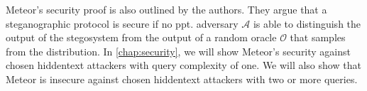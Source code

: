 Meteor's security proof is also outlined by the authors.
They argue that a steganographic protocol is secure if no ppt. adversary $\mathcal{A}$ is able to distinguish the output of the stegosystem from the output of a random oracle $\mathcal{O}$ that samples from the distribution.
In \autoref{chap:security}, we will show Meteor's security against chosen hiddentext attackers with query complexity of one.
We will also show that Meteor is insecure against chosen hiddentext attackers with two or more queries.
